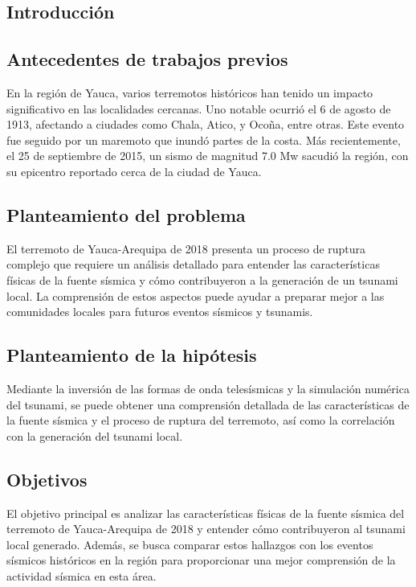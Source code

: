 \documentclass[spanish,a4paper,11pt]{article}
\begin{document}
\subsection{Introducción} 

\subsection*{Antecedentes de trabajos previos}
\noindent En la región de Yauca, varios terremotos históricos han tenido un impacto significativo en las localidades cercanas. Uno notable ocurrió el 6 de agosto de 1913, afectando a ciudades como Chala, Atico, y Ocoña, entre otras. Este evento fue seguido por un maremoto que inundó partes de la costa. Más recientemente, el 25 de septiembre de 2015, un sismo de magnitud 7.0 Mw sacudió la región, con su epicentro reportado cerca de la ciudad de Yauca.

\subsection*{Planteamiento del problema}
\noindent El terremoto de Yauca-Arequipa de 2018 presenta un proceso de ruptura complejo que requiere un análisis detallado para entender las características físicas de la fuente sísmica y cómo contribuyeron a la generación de un tsunami local. La comprensión de estos aspectos puede ayudar a preparar mejor a las comunidades locales para futuros eventos sísmicos y tsunamis.

\subsection*{Planteamiento de la hipótesis}
\noindent Mediante la inversión de las formas de onda telesísmicas y la simulación numérica del tsunami, se puede obtener una comprensión detallada de las características de la fuente sísmica y el proceso de ruptura del terremoto, así como la correlación con la generación del tsunami local.

\subsection*{Objetivos} 
\noindent El objetivo principal es analizar las características físicas de la fuente sísmica del terremoto de Yauca-Arequipa de 2018 y entender cómo contribuyeron al tsunami local generado. Además, se busca comparar estos hallazgos con los eventos sísmicos históricos en la región para proporcionar una mejor comprensión de la actividad sísmica en esta área.
\end{document}

